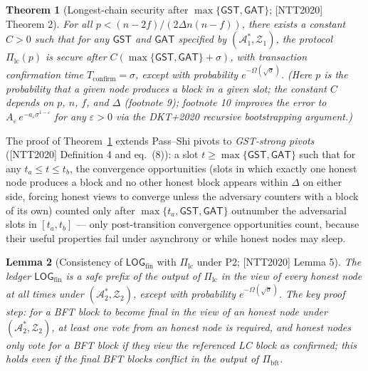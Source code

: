 \documentclass[11pt,a4paper]{article}
\newtheorem{theorem}{Theorem}[section]
\newtheorem{lemma}[theorem]{Lemma}
\theoremstyle{definition}
\begin{document}
\begin{theorem}[Longest-chain security after
$\max\{\mathsf{GST},\mathsf{GAT}\}$; {[NTT2020]} Theorem 2]
\label{thm:xl-lc-after-gst}
For all $p < (n - 2f) / (2 \Delta n (n - f))$, there exists a constant
$C > 0$ such that for any $\mathsf{GST}$ and $\mathsf{GAT}$ specified by
$(\mathcal{A}_1^*, \mathcal{Z}_1)$, the protocol $\Pi_{\mathrm{lc}}(p)$ is
secure after $C(\max\{\mathsf{GST}, \mathsf{GAT}\} + \sigma)$, with
transaction confirmation time $T_{\mathrm{confirm}} = \sigma$, except with
probability $e^{-\Omega(\sqrt{\sigma})}$. (Here $p$ is the probability
that a given node produces a block in a given slot; the constant $C$
depends on $p$, $n$, $f$, and $\Delta$ (footnote 9); footnote 10 improves
the error to $A_\varepsilon\, e^{-a_\varepsilon \sigma^{1-\varepsilon}}$
for any $\varepsilon > 0$ via the DKT+2020 recursive bootstrapping
argument.)
\end{theorem}

The proof of Theorem~\ref{thm:xl-lc-after-gst} extends Pass--Shi pivots to
\emph{GST-strong pivots} ([NTT2020] Definition 4 and eq.~(8)): a slot
$t \ge \max\{\mathsf{GST}, \mathsf{GAT}\}$ such that for any $t_a \le t
\le t_b$, the convergence opportunities (slots in which exactly one
honest node produces a block and no other honest block appears within
$\Delta$ on either side, forcing honest views to converge unless the
adversary counters with a block of its own) counted only after
$\max\{t_a, \mathsf{GST}, \mathsf{GAT}\}$ outnumber the adversarial slots
in $[t_a, t_b]$ --- only post-transition convergence opportunities count,
because their useful properties fail under asynchrony or while honest
nodes may sleep.

\begin{lemma}[Consistency of $\mathsf{LOG}_{\mathrm{fin}}$ with
$\Pi_{\mathrm{lc}}$ under P2; {[NTT2020]} Lemma 5]\label{lem:xl-ntt-l5}
The ledger $\mathsf{LOG}_{\mathrm{fin}}$ is a safe prefix of the output of
$\Pi_{\mathrm{lc}}$ in the view of every honest node at all times under
$(\mathcal{A}_2^*, \mathcal{Z}_2)$, except with probability
$e^{-\Omega(\sqrt{\sigma})}$. The key proof step: for a BFT block to
become final in the view of an honest node under
$(\mathcal{A}_2^*, \mathcal{Z}_2)$, at least one vote from an honest node
is required, and honest nodes only vote for a BFT block if they view the
referenced LC block as confirmed; this holds even if the final BFT blocks
conflict in the output of $\Pi_{\mathrm{bft}}$.
\end{lemma}
\end{document}
